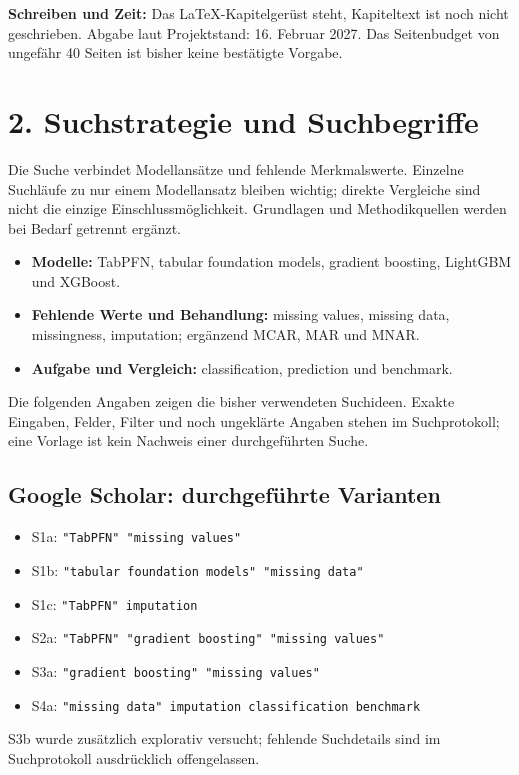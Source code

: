 \documentclass[11pt,a4paper]{article}
\begin{document}
\textbf{Schreiben und Zeit:} Das LaTeX-Kapitelgerüst steht, Kapiteltext ist
noch nicht geschrieben. Abgabe laut Projektstand: 16. Februar 2027. Das
Seitenbudget von ungefähr 40 Seiten ist bisher keine bestätigte Vorgabe.

\section*{2. Suchstrategie und Suchbegriffe}

Die Suche verbindet Modellansätze und fehlende Merkmalswerte. Einzelne
Suchläufe zu nur einem Modellansatz bleiben wichtig; direkte Vergleiche sind
nicht die einzige Einschlussmöglichkeit. Grundlagen und Methodikquellen
werden bei Bedarf getrennt ergänzt.

\begin{itemize}
  \item \textbf{Modelle:} TabPFN, tabular foundation models, gradient boosting,
  LightGBM und XGBoost.
  \item \textbf{Fehlende Werte und Behandlung:} missing values, missing data,
  missingness, imputation; ergänzend MCAR, MAR und MNAR.
  \item \textbf{Aufgabe und Vergleich:} classification, prediction und
  benchmark.
\end{itemize}

Die folgenden Angaben zeigen die bisher verwendeten Suchideen.
Exakte Eingaben, Felder, Filter und noch ungeklärte Angaben stehen im
Suchprotokoll; eine Vorlage ist kein Nachweis einer durchgeführten Suche.

\subsection*{Google Scholar: durchgeführte Varianten}
\begin{itemize}
  \item S1a: \verb|"TabPFN" "missing values"|
  \item S1b: \verb|"tabular foundation models" "missing data"|
  \item S1c: \verb|"TabPFN" imputation|
  \item S2a: \verb|"TabPFN" "gradient boosting" "missing values"|
  \item S3a: \verb|"gradient boosting" "missing values"|
  \item S4a: \verb|"missing data" imputation classification benchmark|
\end{itemize}
S3b wurde zusätzlich explorativ versucht; fehlende Suchdetails sind im
Suchprotokoll ausdrücklich offengelassen.
\end{document}
